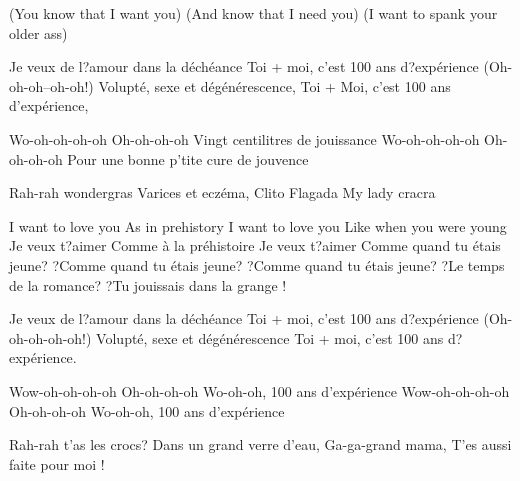 \beginverse
(You know that I want you)
(And know that I need you)
(I want to spank your older ass)
\endverse

\beginverse
Je veux de l?amour dans la déchéance
Toi + moi, c'est 100 ans d?expérience
(Oh-oh-oh--oh-oh!)
Volupté, sexe et dégénérescence,
Toi + Moi, c'est 100 ans d'expérience,
\endverse

\beginchorus
Wo-oh-oh-oh-oh Oh-oh-oh-oh
Vingt centilitres de jouissance
Wo-oh-oh-oh-oh Oh-oh-oh-oh
Pour une bonne p'tite cure de jouvence
\endchorus

\beginverse
Rah-rah wondergras
Varices et eczéma,
Clito Flagada
My lady cracra
\endverse

\beginverse
I want to love you
As in prehistory
I want to love you
Like when you were young
Je veux t?aimer
Comme à la préhistoire
Je veux t?aimer
Comme quand tu étais jeune?
?Comme quand tu étais jeune?
?Comme quand tu étais jeune?
?Le temps de la romance?
?Tu jouissais dans la grange !
\endverse

\beginverse
Je veux de l?amour dans la déchéance
Toi + moi, c'est 100 ans d?expérience
(Oh-oh-oh-oh-oh!)
Volupté, sexe et dégénérescence
Toi + moi, c'est 100 ans d?expérience.
\endverse

\beginchorus
Wow-oh-oh-oh-oh Oh-oh-oh-oh
Wo-oh-oh, 100 ans d'expérience
Wow-oh-oh-oh-oh Oh-oh-oh-oh
Wo-oh-oh, 100 ans d'expérience
\endchorus

\beginverse
Rah-rah t'as les crocs?
Dans un grand verre d'eau,
Ga-ga-grand mama,
T'es aussi faite pour moi !
\endverseverse

\endsong